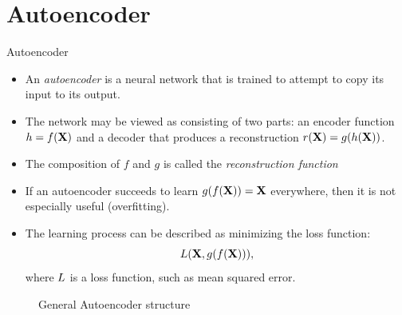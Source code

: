\documentclass[xcolor=pdftex,dvipsnames,table,mathserif]{beamer}
\begin{document}
\section{Autoencoder}
\begin{frame}{Autoencoder}
\begin{itemize}
\item An \emph{autoencoder} is a neural network that is trained to attempt to copy its input to its output.
\item The network may be viewed as consisting of two parts: an
encoder function $h = f (\mathbf{X})$ and a decoder that produces a reconstruction $r(\mathbf{X}) = g(h(\mathbf{X}))$.
\item The composition of $f$ and $g$ is called the \emph{reconstruction function}
\item If an autoencoder succeeds to learn $g(f (\mathbf{X})) = \mathbf{X}$ everywhere, then it is not especially useful (overfitting).
\item The learning process can be described as minimizing the loss function:
\begin{equation}
L ( \mathbf{X} , g(f(\mathbf{X}))),
\end{equation}
where $L$ is a loss function, such as mean squared error.
\end{itemize}
\begin{figure}
\centering
{}
  \caption{General Autoencoder structure}
\end{figure}
\end{frame}
\end{document}
